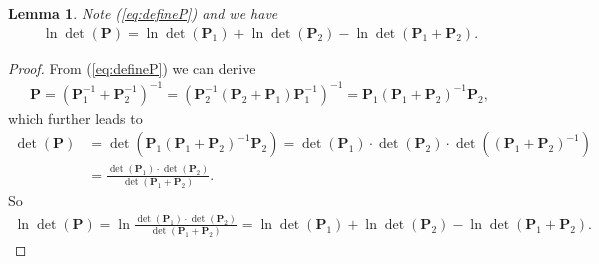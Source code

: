 \documentclass[10pt,a4paper]{amsart}
\newtheorem{lemma}{Lemma}
\begin{document}
\begin{lemma} \label{lm:lndetP}
Note (\ref{eq:defineP}) and we have
\begin{align*}
\ln \det(\mathbf{P}) = \ln \det(\mathbf{P}_{1}) + \ln \det(\mathbf{P}_{2}) - \ln \det(\mathbf{P}_{1} + \mathbf{P}_{2}).
\end{align*}
\end{lemma}

\begin{proof}
From (\ref{eq:defineP}) we can derive
\begin{align*}
\mathbf{P} = (\mathbf{P}_{1}^{-1} + \mathbf{P}_{2}^{-1})^{-1} = (\mathbf{P}_{2}^{-1} (\mathbf{P}_{2} + \mathbf{P}_{1}) \mathbf{P}_{1}^{-1})^{-1} = \mathbf{P}_{1} (\mathbf{P}_{1} + \mathbf{P}_{2})^{-1} \mathbf{P}_{2},
\end{align*}
which further leads to
\begin{align*}
\det(\mathbf{P}) &= \det(\mathbf{P}_{1} (\mathbf{P}_{1} + \mathbf{P}_{2})^{-1} \mathbf{P}_{2}) = \det(\mathbf{P}_{1}) \cdot \det(\mathbf{P}_{2}) \cdot \det((\mathbf{P}_{1} + \mathbf{P}_{2})^{-1}) \\
  &= \frac{\det(\mathbf{P}_{1}) \cdot \det(\mathbf{P}_{2})}{\det(\mathbf{P}_{1} + \mathbf{P}_{2})}.
\end{align*}
So
\begin{align*}
\ln \det(\mathbf{P}) = \ln \frac{\det(\mathbf{P}_{1}) \cdot \det(\mathbf{P}_{2})}{\det(\mathbf{P}_{1} + \mathbf{P}_{2})} = \ln \det(\mathbf{P}_{1}) + \ln \det(\mathbf{P}_{2}) - \ln \det(\mathbf{P}_{1} + \mathbf{P}_{2}).
\end{align*}
\end{proof}
\end{document}
